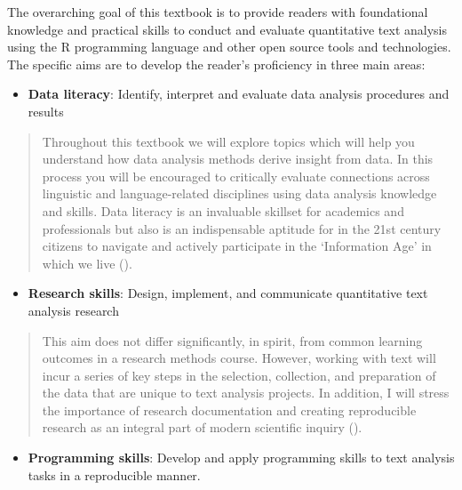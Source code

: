 \documentclass[
  letterpaper,
]{latex/krantz}
\providecommand{\tightlist}{%
  \setlength{\itemsep}{0pt}\setlength{\parskip}{0pt}}\usepackage{longtable,booktabs,array}
\theoremstyle{definition}
\theoremstyle{remark}
\begin{document}
The overarching goal of this textbook is to provide readers with
foundational knowledge and practical skills to conduct and evaluate
quantitative text analysis using the R programming language and other
open source tools and technologies. The specific aims are to develop the
reader's proficiency in three main areas:

\begin{itemize}
\tightlist
\item
  \textbf{Data literacy}: Identify, interpret and
  evaluate data analysis procedures and results
\end{itemize}

\begin{quote}
Throughout this textbook we will explore topics which will help you
understand how data analysis methods derive insight from data. In this
process you will be encouraged to critically evaluate connections across
linguistic and language-related disciplines using data analysis
knowledge and skills. Data literacy is an invaluable skillset for
academics and professionals but also is an indispensable aptitude for in
the 21st century citizens to navigate and actively participate in the
`Information Age' in which we live ().
\end{quote}

\begin{itemize}
\tightlist
\item
  \textbf{Research skills}: Design, implement, and communicate
  quantitative text analysis research
\end{itemize}

\begin{quote}
This aim does not differ significantly, in spirit, from common learning
outcomes in a research methods course. However, working with text will
incur a series of key steps in the selection, collection, and
preparation of the data that are unique to text analysis projects. In
addition, I will stress the importance of research documentation and
creating reproducible research as an integral part of modern scientific
inquiry ().
\end{quote}

\begin{itemize}
\tightlist
\item
  \textbf{Programming skills}: Develop and apply programming skills to
  text analysis tasks in a reproducible manner.
\end{itemize}
\end{document}
